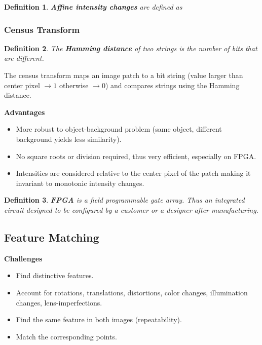 \documentclass[10pt,a4paper]{scrartcl}
\newtheorem{define}{Definition}
\begin{document}
\begin{multicols*}{2}
\begin{define}
\textbf{Affine intensity changes} are defined as 

\end{define}

\subsubsection{Census Transform}

\begin{define}
The \textbf{Hamming distance} of two strings is the number of bits that are different.
\end{define}

The census transform maps an image patch to a bit string (value larger than center pixel $\rightarrow 1$ otherwise $\rightarrow 0$) and compares strings using the Hamming distance.


\textbf{Advantages}
\begin{itemize}
\item More robust to object-background problem (same object, different background yields less similarity).
\item No square roots or division required, thus very efficient, especially on FPGA. 
\item Intensities are considered relative to the center pixel of the patch making it invariant to monotonic intensity changes.
\end{itemize}

\begin{define}
\textbf{FPGA} is a field programmable gate array. Thus an  integrated circuit designed to be configured by a customer or a designer after manufacturing.
\end{define}

\subsection{Feature Matching}

\textbf{Challenges}
\begin{itemize}
\item Find distinctive features.
\item Account for rotations, translations, distortions, color changes, illumination changes, lens-imperfections.
\item Find the same feature in both images (repeatability).
\item Match the corresponding points.
\end{itemize}


\end{multicols*}
\end{document}
